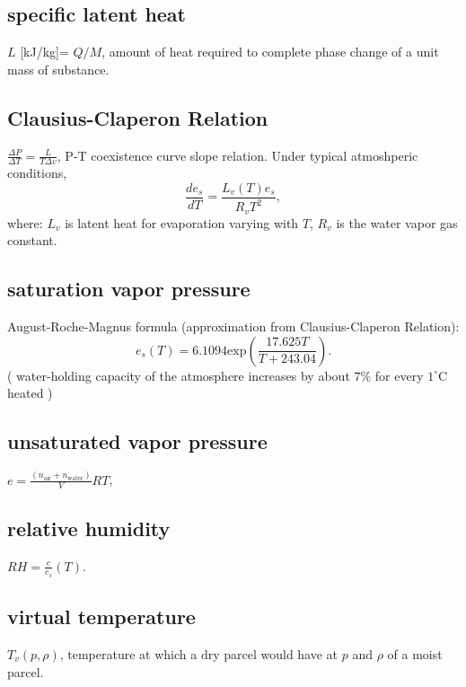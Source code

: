 \subsection{specific latent heat}
\begin{defn*} $L$ [kJ/kg]= $Q/M$, amount of heat required to complete phase change of a unit
mass of substance.
\end{defn*}

\subsection{Clausius-Claperon Relation}
\begin{defn*} $\frac{\Delta P}{\Delta T} = \frac{L}{T\Delta v}$, P-T coexistence curve slope
relation. Under typical atmoshperic conditions, 
\begin{equation}
   \frac{d e_s}{dT} = \frac{L_v(T)e_s}{R_vT^2}, 
\end{equation}
where: $L_v$ is latent heat for evaporation varying with $T$, $R_v$ is the water vapor gas constant.
\end{defn*}


\subsection{saturation vapor pressure}
August-Roche-Magnus formula (approximation from Clausius-Claperon Relation): \\
\begin{equation}
   e_s(T) = 6.1094 \text{exp}(\frac{17.625T}{T+243.04}).
\end{equation}
( water-holding capacity of the atmosphere increases by about $7\%$ for every $1^{\circ}$C heated )

\subsection{unsaturated vapor pressure}
\begin{defn*} $e = \frac{(n_{\text{air}} + n_{\text{water}})}{V}RT$, 
\end{defn*}

\subsection{relative humidity}
\begin{defn*} $RH = \frac{e}{e_s}(T)$.
\end{defn*}

\subsection{virtual temperature}
\begin{defn*} 
$T_v(p,\rho)$, temperature at which a dry parcel would have at $p$ and $\rho$ of a moist parcel. 
\end{defn*}

